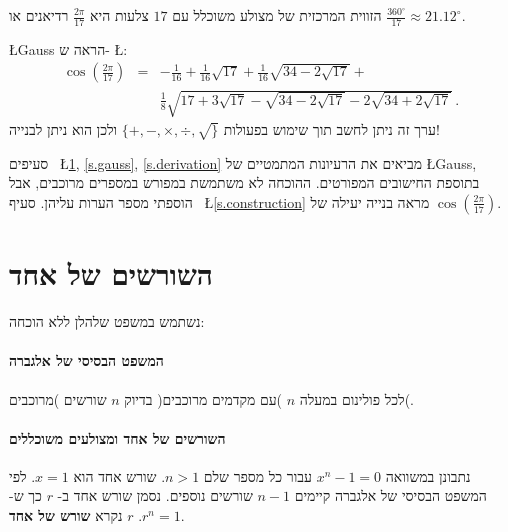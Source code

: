\documentclass[11pt,a4paper]{article}
\newenvironment{form}[1]{%
\begin{displaymath}%
\renewcommand{\arraystretch}{#1}%
\begin{array}{lcl}}%
{\end{array}%
\end{displaymath}%
}
\newcommand*{\disfrac}[2]{\displaystyle\frac{#1}{#2}}
\newcommand*{\sm}[1]{$\scriptstyle #1$}
\begin{document}
הזווית המרכזית של מצולע משוכלל עם 
$17$
צלעות היא
$\disfrac{2\pi}{17}$
רדיאנים או
$\disfrac{360^\circ}{17}\approx 21.12^\circ$. 
\begin{center}
\end{center}
\L{Gauss}
הראה ש-%
\L{\cite{gauss,jorg}}:
\begin{form}{3}
\cos\left(\disfrac{2\pi}{17}\right) &=& 
-\disfrac{1}{16}+\disfrac{1}{16}\sqrt{17} + 
     \disfrac{1}{16}\sqrt{34-2\sqrt{17}}
    + \\
    &&
     \disfrac{1}{8}\sqrt{
     17+3\sqrt{17} - 
     \sqrt{34-2\sqrt{17}}
   -2
     \sqrt{34+2\sqrt{17}}
   }\,.
\end{form}
ערך זה ניתן לחשב תוך שימוש בפעולות
$\{+,-,\times,\div,\surd\}$
ולכן הוא ניתן לבנייה!

סעיפים~%
\L{\ref{s.roots}, \ref{s.gauss}, \ref{s.derivation}}
מביאים את הרעיונות המתמטיים של
\L{Gauss},
בתוספת החישובים המפורטים.
ההוכחה לא משתמשת במפורש במספרים מרוכבים, אבל הוספתי מספר הערות עליהן.
סעיף~%
\L{\ref{s.construction}}
מראה בנייה יעילה של
$\cos\left(\disfrac{2\pi}{17}\right)$.

\newpage

\section{השורשים של אחד}\label{s.roots}

נשתמש במשפט שלהלן ללא הוכחה:
\paragraph{המשפט הבסיסי של אלגברה}
לכל פולינום במעלה 
$n$
)עם מקדמים מרוכבים(
בדיוק
$n$
שורשים
)מרוכבים(.

\paragraph{%
השורשים של אחד ומצולעים משוכללים%
}
נתבונן במשוואה
$x^{n}-1=0$
עבור כל מספר שלם
$n>	 1$.
שורש אחד הוא
$x=1$.
לפי המשפט הבסיסי של אלגברה קיימים
$n-1$
שורשים נוספים. נסמן שורש אחד ב-%
$r$
כך ש-%
$r^{n}=1$.
$r$
נקרא
\textbf{שורש של אחד}.
\end{document}
